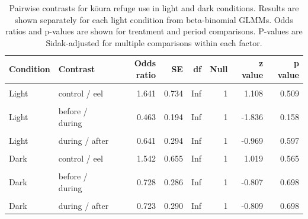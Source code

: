 \documentclass[
  12pt,
  a4paper,
  oneside]{scrbook}
\begin{document}
\begingroup\fontsize{9}{11}\selectfont

\begin{longtable}[t]{llrrrrrr}

\caption{\label{tbl-emmeans-stratified}Pairwise contrasts for kōura
refuge use in light and dark conditions. Results are shown separately
for each light condition from beta-binomial GLMMs. Odds ratios and
p-values are shown for treatment and period comparisons. P-values are
Sidak-adjusted for multiple comparisons within each factor.}

\tabularnewline

\toprule
Condition & Contrast & Odds ratio & SE & df & Null & z value & p value\\
\midrule
\cellcolor{gray!8}{Light} & \cellcolor{gray!8}{control / catfish} & \cellcolor{gray!8}{0.863} & \cellcolor{gray!8}{0.396} & \cellcolor{gray!8}{Inf} & \cellcolor{gray!8}{1} & \cellcolor{gray!8}{-0.322} & \cellcolor{gray!8}{0.944}\\
Light & control / eel & 1.641 & 0.734 & Inf & 1 & 1.108 & 0.509\\
\cellcolor{gray!8}{Light} & \cellcolor{gray!8}{catfish / eel} & \cellcolor{gray!8}{1.903} & \cellcolor{gray!8}{0.866} & \cellcolor{gray!8}{Inf} & \cellcolor{gray!8}{1} & \cellcolor{gray!8}{1.414} & \cellcolor{gray!8}{0.333}\\
Light & before / during & 0.463 & 0.194 & Inf & 1 & -1.836 & 0.158\\
\cellcolor{gray!8}{Light} & \cellcolor{gray!8}{before / after} & \cellcolor{gray!8}{0.297} & \cellcolor{gray!8}{0.135} & \cellcolor{gray!8}{Inf} & \cellcolor{gray!8}{1} & \cellcolor{gray!8}{-2.672} & \cellcolor{gray!8}{0.021}\\
\addlinespace
Light & during / after & 0.641 & 0.294 & Inf & 1 & -0.969 & 0.597\\
\cellcolor{gray!8}{Dark} & \cellcolor{gray!8}{control / catfish} & \cellcolor{gray!8}{0.393} & \cellcolor{gray!8}{0.172} & \cellcolor{gray!8}{Inf} & \cellcolor{gray!8}{1} & \cellcolor{gray!8}{-2.133} & \cellcolor{gray!8}{0.083}\\
Dark & control / eel & 1.542 & 0.655 & Inf & 1 & 1.019 & 0.565\\
\cellcolor{gray!8}{Dark} & \cellcolor{gray!8}{catfish / eel} & \cellcolor{gray!8}{3.924} & \cellcolor{gray!8}{1.693} & \cellcolor{gray!8}{Inf} & \cellcolor{gray!8}{1} & \cellcolor{gray!8}{3.170} & \cellcolor{gray!8}{0.004}\\
Dark & before / during & 0.728 & 0.286 & Inf & 1 & -0.807 & 0.698\\
\addlinespace
\cellcolor{gray!8}{Dark} & \cellcolor{gray!8}{before / after} & \cellcolor{gray!8}{0.527} & \cellcolor{gray!8}{0.215} & \cellcolor{gray!8}{Inf} & \cellcolor{gray!8}{1} & \cellcolor{gray!8}{-1.569} & \cellcolor{gray!8}{0.259}\\
Dark & during / after & 0.723 & 0.290 & Inf & 1 & -0.809 & 0.698\\
\bottomrule

\end{longtable}
\end{document}
